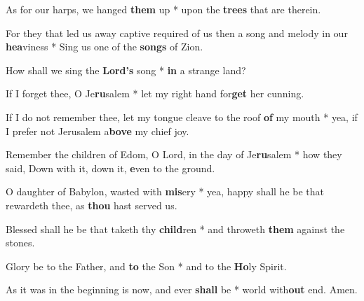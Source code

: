 \begin{multicols}{2}
	As for our harps, we hanged \textbf{them} up * upon the \textbf{trees} that are therein.
	
	For they that led us away captive required of us then a song and melody in our \textbf{hea}viness * Sing us one of the \textbf{songs} of Zion.
	
	How shall we sing the \textbf{Lord's} song * \textbf{in} a strange land?
	
	If I forget thee, O Je\textbf{ru}salem * let my right hand for\textbf{get} her cunning.
	
	If I do not remember thee, let my tongue cleave to the roof \textbf{of} my mouth * yea, if I prefer not Jerusalem a\textbf{bove} my chief joy.
	
	Remember the children of Edom, O Lord, in the day of Je\textbf{ru}salem * how they said, Down with it, down it, \textbf{e}ven to the ground.
	
	O daughter of Babylon, wasted with \textbf{mis}ery * yea, happy shall he be that rewardeth thee, as \textbf{thou} hast served us.
	
	Blessed shall he be that taketh thy \textbf{child}ren * and throweth \textbf{them} against the stones.
	
	Glory be to the Father, and \textbf{to} the Son * and to the \textbf{Ho}ly Spirit.
	
	As it was in the beginning is now, and ever \textbf{shall} be * world with\textbf{out} end. Amen.
\end{multicols}